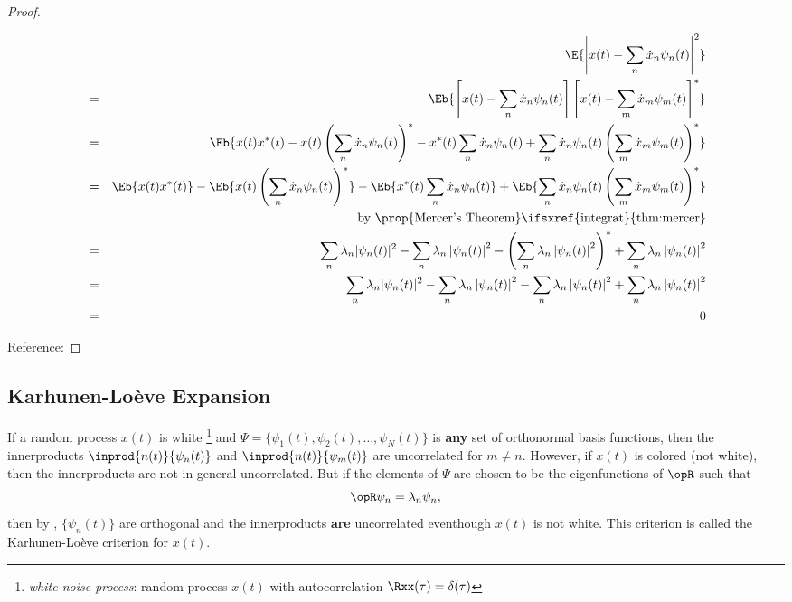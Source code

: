 \begin{proof}
\begin{enumerate}
\begin{eqnarray*}
  &&\E{\left| x(t)-\sum_n \dot{x}_n \psi_n(t) \right|^2}
  \\&=& \Eb{\left[ x(t)-\sum_n \dot{x}_n \psi_n(t) \right]\left[ x(t)-\sum_m \dot{x}_m \psi_m(t) \right]^\ast}
  \\&=& \Eb{x(t)x^\ast(t) -x(t)\left(\sum_n \dot{x}_n \psi_n(t)\right)^\ast -x^\ast(t)\sum_n \dot{x}_n \psi_n(t) + \sum_n \dot{x}_n \psi_n(t) \left(\sum_m \dot{x}_m \psi_m(t) \right)^\ast }
  \\&=& \Eb{x(t)x^\ast(t)} -\Eb{x(t)\left(\sum_n \dot{x}_n \psi_n(t)\right)^\ast} -\Eb{x^\ast(t)\sum_n \dot{x}_n \psi_n(t)} + \Eb{\sum_n \dot{x}_n \psi_n(t) \left(\sum_m \dot{x}_m \psi_m(t) \right)^\ast }
  \\&&  \text{by \prop{Mercer's Theorem}\ifsxref{integrat}{thm:mercer}}
  \\&=& \sum_n \lambda_n |\psi_n(t)|^2 -\sum_n \lambda_n \left|\psi_n(t) \right|^2  -\left(\sum_n \lambda_n \left|\psi_n(t) \right|^2\right)^\ast + \sum_n \lambda_n \left|\psi_n(t) \right|^2
  \\&=& \sum_n \lambda_n |\psi_n(t)|^2 -\sum_n \lambda_n \left|\psi_n(t) \right|^2  -\sum_n \lambda_n \left|\psi_n(t) \right|^2 + \sum_n \lambda_n \left|\psi_n(t) \right|^2
  \\&=& 0
\end{eqnarray*}
\end{enumerate}
Reference: 
\end{proof}

\subsection{Karhunen-Lo\`{e}ve Expansion}
\label{sec:KL}
If a random process $x(t)$ is white
\footnote{{\em white noise process}: random process $x(t)$ with autocorrelation $\Rxx(\tau)=\delta(\tau)$}
and $\Psi=\{\psi_1(t),\psi_2(t),\ldots,\psi_N(t)\}$ is \textbf{any} set of orthonormal basis functions,
then the innerproducts
$\inprod{n(t)}{\psi_n(t)}$ and $\inprod{n(t)}{\psi_m(t)}$ are uncorrelated
for $m\ne  n$.
However, if $x(t)$ is colored (not white), then the innerproducts are not
in general uncorrelated.
But if the elements of $\Psi$ are chosen to be the eigenfunctions of $\opR$ such
that
\[ \opR \psi_n = \lambda_n \psi_n,\]
then by , $\{\psi_n(t)\}$ are orthogonal and
the innerproducts \textbf{are} uncorrelated eventhough $x(t)$ is
not white.
This criterion is called the  Karhunen-Lo\`{e}ve criterion for $x(t)$.





